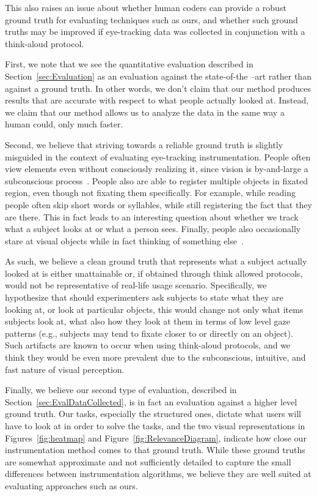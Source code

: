 This also raises an issue about whether human coders can provide a robust ground truth for evaluating techniques such as ours, and whether such ground truths may be improved if eye-tracking data was collected in conjunction with a think-aloud protocol. 


First, we note that we see the quantitative evaluation described in Section~\ref{sec:Evaluation} as an evaluation against the state-of-the –art rather than against a ground truth. In other words, we don't claim that our method produces results that are accurate with respect to what people actually looked at. Instead, we claim that our method allows us to analyze the data in the same way a human could, only much faster. 

Second, we believe that striving towards a reliable ground truth is slightly misguided in the context of evaluating eye-tracking instrumentation.  People often view elements even without consciously realizing it, since vision is by-and-large a subconscious process~\cite{duchowski2007eye}. People also are able to register multiple objects in fixated region, even though not fixating them specifically. For example, while reading people often skip short words or syllables, while still registering the fact that they are there. This in fact leads to an interesting question about whether we track what a subject looks at or what a person sees. Finally, people also occasionally stare at visual objects while in fact thinking of something else~\cite{duchowski2007eye}. 


As such, we believe a clean ground truth that represents what a subject actually looked at is either unattainable or, if obtained through think allowed protocols, would not be representative of real-life usage scenario. Specifically, we hypothesize that should experimenters ask subjects to state what they are looking at, or look at particular objects, this would change not only what items subjects look at, what also how they look at them in terms of low level gaze patterns (e.g., subjects may tend to fixate closer to or directly on an object). Such artifacts are known to occur when using think-aloud protocols, and we think they would be even more prevalent due to the subconscious, intuitive, and fast nature of visual perception.   

Finally, we believe our second type of evaluation, described in Section~\ref{sec:EvalDataCollected}, is in fact an evaluation against a higher level ground truth. Our tasks, especially the structured ones, dictate what users will have to look at in order to solve the tasks, and the two visual representations in Figures~\ref{fig:heatmap} and Figure~\ref{fig:RelevanceDiagram}, indicate how close our instrumentation method comes to that ground truth. While these ground truths are somewhat approximate and not sufficiently detailed to capture the small differences between instrumentation algorithms, we believe they are well suited at evaluating approaches such as ours.   
